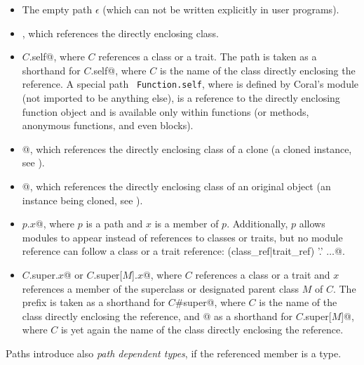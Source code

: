 \begin{itemize}
\item 
The empty path $\epsilon$ (which can not be written explicitly in user programs). 

\item 
{}, which references the directly enclosing class. 

\item 
\lstinline@$C$.self@, where $C$ references a class or a trait. The path  is taken as a shorthand for \lstinline@$C$.self@, where $C$ is the name of the class directly enclosing the reference. A special path ~\lstinline!Function.self!, where  is defined by Coral's  module (not imported to be anything else), is a reference to the directly enclosing function object and is available only within functions (or methods, anonymous functions, and even blocks).

\item
\lstinline@self[cloned]@, which references the directly enclosing class of a clone (a cloned instance, see ). 

\item
\lstinline@self[origin]@, which references the directly enclosing class of an original object (an instance being cloned, see ). 

\item 
\lstinline@$p$.$x$@, where $p$ is a path and $x$ is a member of $p$. Additionally, $p$ allows modules to appear instead of references to classes or traits, but no module reference can follow a class or a trait reference:  {(class_ref|trait_ref) '.'} $\ldots$@. 

\item
\lstinline@$C$.super.$x$@ or \lstinline@$C$.super[$M$].$x$@, where $C$ references a class or a trait and $x$ references a member of the superclass or designated parent class $M$ of $C$. The prefix  is taken as a shorthand for \lstinline@$C$#super@, where $C$ is the name of the class directly enclosing the reference, and \lstinline@super[$M$]@ as a shorthand for \lstinline@$C$.super[$M$]@, where $C$ is yet again the name of the class directly enclosing the reference. 
\end{itemize}

Paths introduce also {\em path dependent types}, if the referenced member is a type. 






